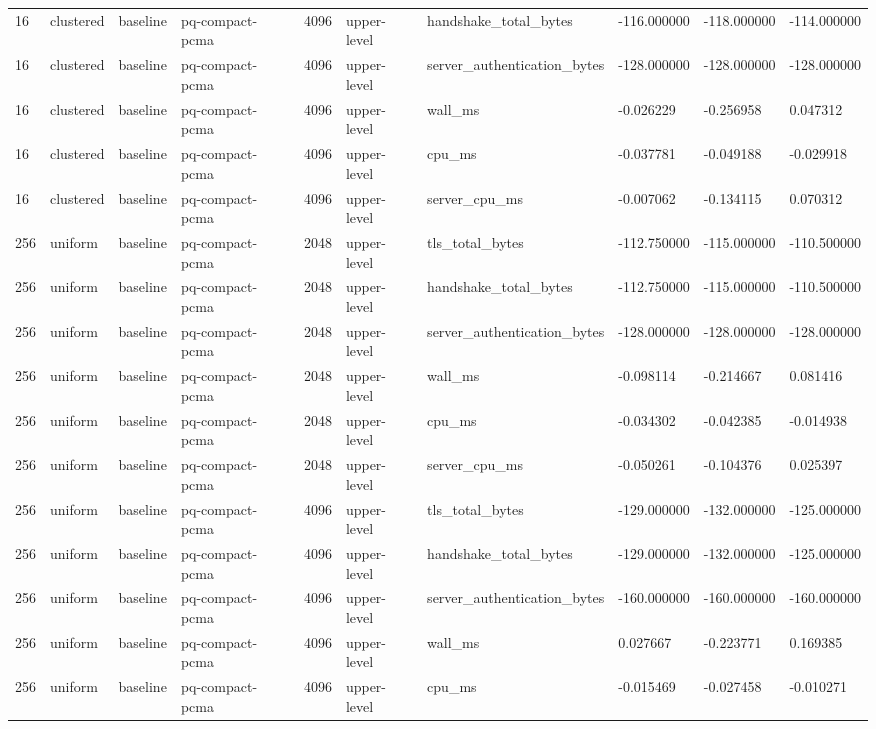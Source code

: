 \begin{tabular}{llllllllll}
16 & clustered & baseline & pq-compact-pcma & 4096 & upper-level & handshake\_total\_bytes & -116.000000 & -118.000000 & -114.000000 \\
16 & clustered & baseline & pq-compact-pcma & 4096 & upper-level & server\_authentication\_bytes & -128.000000 & -128.000000 & -128.000000 \\
16 & clustered & baseline & pq-compact-pcma & 4096 & upper-level & wall\_ms & -0.026229 & -0.256958 & 0.047312 \\
16 & clustered & baseline & pq-compact-pcma & 4096 & upper-level & cpu\_ms & -0.037781 & -0.049188 & -0.029918 \\
16 & clustered & baseline & pq-compact-pcma & 4096 & upper-level & server\_cpu\_ms & -0.007062 & -0.134115 & 0.070312 \\
256 & uniform & baseline & pq-compact-pcma & 2048 & upper-level & tls\_total\_bytes & -112.750000 & -115.000000 & -110.500000 \\
256 & uniform & baseline & pq-compact-pcma & 2048 & upper-level & handshake\_total\_bytes & -112.750000 & -115.000000 & -110.500000 \\
256 & uniform & baseline & pq-compact-pcma & 2048 & upper-level & server\_authentication\_bytes & -128.000000 & -128.000000 & -128.000000 \\
256 & uniform & baseline & pq-compact-pcma & 2048 & upper-level & wall\_ms & -0.098114 & -0.214667 & 0.081416 \\
256 & uniform & baseline & pq-compact-pcma & 2048 & upper-level & cpu\_ms & -0.034302 & -0.042385 & -0.014938 \\
256 & uniform & baseline & pq-compact-pcma & 2048 & upper-level & server\_cpu\_ms & -0.050261 & -0.104376 & 0.025397 \\
256 & uniform & baseline & pq-compact-pcma & 4096 & upper-level & tls\_total\_bytes & -129.000000 & -132.000000 & -125.000000 \\
256 & uniform & baseline & pq-compact-pcma & 4096 & upper-level & handshake\_total\_bytes & -129.000000 & -132.000000 & -125.000000 \\
256 & uniform & baseline & pq-compact-pcma & 4096 & upper-level & server\_authentication\_bytes & -160.000000 & -160.000000 & -160.000000 \\
256 & uniform & baseline & pq-compact-pcma & 4096 & upper-level & wall\_ms & 0.027667 & -0.223771 & 0.169385 \\
256 & uniform & baseline & pq-compact-pcma & 4096 & upper-level & cpu\_ms & -0.015469 & -0.027458 & -0.010271 \\

\end{tabular}
